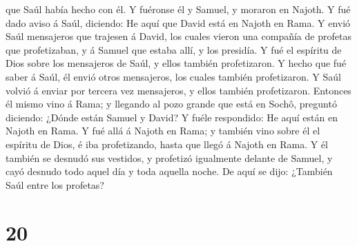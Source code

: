 que Saúl había hecho con él. Y fuéronse él y Samuel, y moraron en
Najoth.  Y fué dado aviso á Saúl, diciendo: He aquí que
David está en Najoth en Rama.  Y envió Saúl mensajeros que
trajesen á David, los cuales vieron una compañía de profetas que
profetizaban, y á Samuel que estaba allí, y los presidía. Y fué el
espíritu de Dios sobre los mensajeros de Saúl, y ellos también
profetizaron.  Y hecho que fué saber á Saúl, él envió otros
mensajeros, los cuales también profetizaron. Y Saúl volvió á enviar por
tercera vez mensajeros, y ellos también profetizaron. 
Entonces él mismo vino á Rama; y llegando al pozo grande que está en
Sochô, preguntó diciendo: ¿Dónde están Samuel y David? Y fuéle
respondido: He aquí están en Najoth en Rama.  Y fué allá á
Najoth en Rama; y también vino sobre él el espíritu de Dios, é iba
profetizando, hasta que llegó á Najoth en Rama.  Y él
también se desnudó sus vestidos, y profetizó igualmente delante de
Samuel, y cayó desnudo todo aquel día y toda aquella noche. De aquí se
dijo: ¿También Saúl entre los profetas?

\hypertarget{section-19}{%
\section{20}\label{section-19}}


